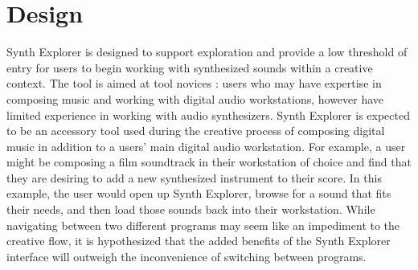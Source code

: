 

\section{Design}
Synth Explorer is designed to support exploration and provide a low threshold of entry for users to begin working with synthesized sounds within a creative context. The tool is aimed at tool novices \cite{davis2013toward}: users who may have expertise in composing music and working with digital audio workstations, however have limited experience in working with audio synthesizers. Synth Explorer is expected to be an accessory tool used during the creative process of composing digital music in addition to a users' main digital audio workstation. For example, a user might be composing a film soundtrack in their workstation of choice and find that they are desiring to add a new synthesized instrument to their score. In this example, the user would open up Synth Explorer, browse for a sound that fits their needs, and then load those sounds back into their workstation. While navigating between two different programs may seem like an impediment to the creative flow, it is hypothesized that the added benefits of the Synth Explorer interface will outweigh the inconvenience of switching between programs.

